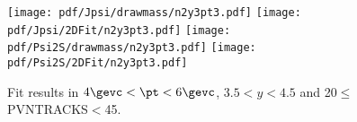 \begin{figure}[H]
\begin{center}
\texttt{[image: pdf/Jpsi/drawmass/n2y3pt3.pdf]}
\texttt{[image: pdf/Jpsi/2DFit/n2y3pt3.pdf]}
\vspace*{-0.5cm}
\texttt{[image: pdf/Psi2S/drawmass/n2y3pt3.pdf]}
\texttt{[image: pdf/Psi2S/2DFit/n2y3pt3.pdf]}
\vspace*{-0.5cm}
\end{center}
\caption{Fit results in $4\gevc<\pt<6\gevc$, $3.5<y<4.5$ and 20$\leq$PVNTRACKS$<$45.}
\label{Fitn2y3pt3}
\end{figure}
